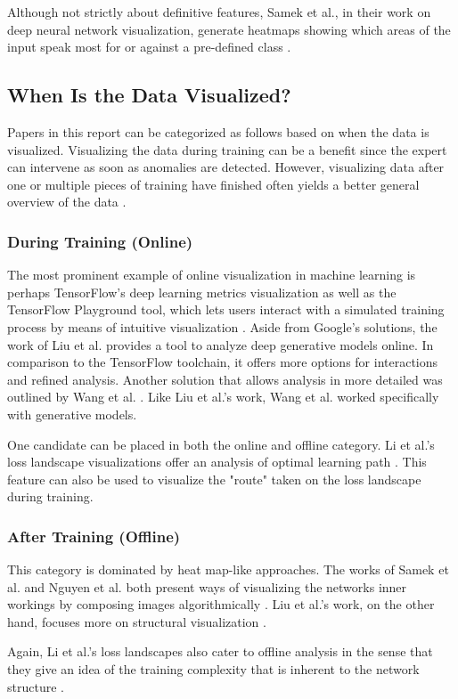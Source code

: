 \documentclass{acmsiggraph}               %
\begin{document}
Although not strictly about definitive features, Samek et al., in their work on deep neural network visualization, generate heatmaps showing which areas of the input speak most for or against a pre-defined class \cite{Samek2017}.

\subsection{When Is the Data Visualized?}
Papers in this report can be categorized as follows based on when the data is visualized. Visualizing the data during training can be a benefit since the expert can intervene as soon as anomalies are detected. However, visualizing data after one or multiple pieces of training have finished often yields a better general overview of the data \cite{Hohman2018}.
\subsubsection{During Training (Online)}
The most prominent example of online visualization in machine learning is perhaps TensorFlow's deep learning metrics visualization \cite{Wongsuphasawat2018} as well as the TensorFlow Playground tool, which lets users interact with a simulated training process by means of intuitive visualization \cite{Smilkov2017}.
Aside from Google's solutions, the work of Liu et al. \cite{Liu2018} provides a tool to analyze deep generative models online. In comparison to the TensorFlow toolchain, it offers more options for interactions and refined analysis. Another solution that allows analysis in more detailed was outlined by Wang et al. \cite{Wang}. Like Liu et al.'s work, Wang et al. worked specifically with generative models.

One candidate can be placed in both the online and offline category. Li et al.'s loss landscape visualizations offer an analysis of optimal learning path \cite{Li2017}. This feature can also be used to visualize the "route" taken on the loss landscape during training.

\subsubsection{After Training (Offline)}
This category is dominated by heat map-like approaches. The works of Samek et al. and Nguyen et al. both present ways of visualizing the networks inner workings by composing images algorithmically \cite{Samek2017,Nguyen2016}. 
Liu et al.'s work, on the other hand, focuses more on structural visualization \cite{Liu2016}.

Again, Li et al.'s loss landscapes also cater to offline analysis in the sense that they give an idea of the training complexity that is inherent to the network structure \cite{Li2017}.


\nocite{*}

\end{document}

